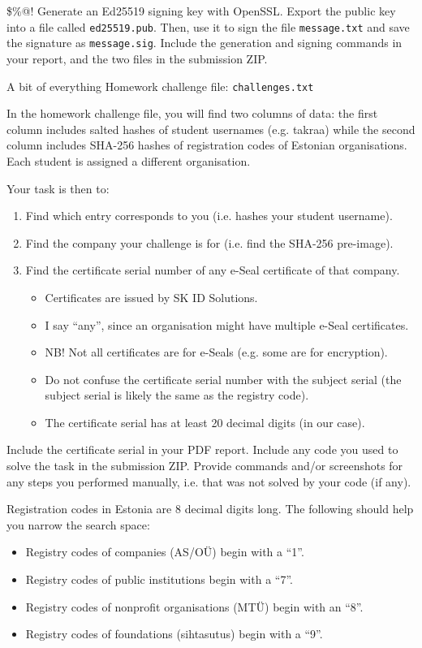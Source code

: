 \documentclass{homework}
\begin{document}
\begin{task}{\$\%@!}
  Generate an Ed25519 signing key with OpenSSL.
  Export the public key into a file called \texttt{ed25519.pub}.
  Then, use it to sign the file \texttt{message.txt} and save the signature as \texttt{message.sig}.
  Include the generation and signing commands in your report, and the two files in the submission ZIP.
\end{task}

\newpage

\begin{task}{A bit of everything}
  Homework challenge file: \texttt{challenges.txt}

  In the homework challenge file, you will find two columns of data: the first column includes salted hashes of student usernames (e.g. takraa) while the second column includes SHA-256 hashes of registration codes of Estonian organisations.
  Each student is assigned a different organisation.

  Your task is then to:
  \begin{enumerate}
    \item Find which entry corresponds to you (i.e. hashes your student username).
    \item Find the company your challenge is for (i.e. find the SHA-256 pre-image).
    \item Find the certificate serial number of any e-Seal certificate of that company.
    \begin{itemize}
      \item Certificates are issued by SK ID Solutions.
      \item I say \enquote{any}, since an organisation might have multiple e-Seal certificates.
      \item NB! Not all certificates are for e-Seals (e.g. some are for encryption).
      \item Do not confuse the certificate serial number with the subject serial (the subject serial is likely the same as the registry code).
      \item The certificate serial has at least 20 decimal digits (in our case).
    \end{itemize}
  \end{enumerate}

  Include the certificate serial in your PDF report.
  Include any code you used to solve the task in the submission ZIP.
  Provide commands and/or screenshots for any steps you performed manually, i.e. that was not solved by your code (if any).

  Registration codes in Estonia are 8 decimal digits long.
  The following should help you narrow the search space:
  \begin{itemize}
    \item Registry codes of companies (AS/OÜ) begin with a \enquote{1}.
    \item Registry codes of public institutions begin with a \enquote{7}.
    \item Registry codes of nonprofit organisations (MTÜ) begin with an \enquote{8}.
    \item Registry codes of foundations (sihtasutus) begin with a \enquote{9}.
  \end{itemize}
\end{task}
\end{document}
